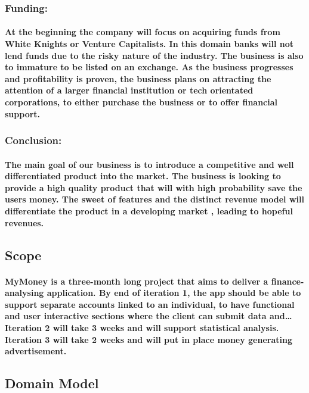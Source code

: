 \documentclass{article}
\begin{document}
\subsubsection{Funding:}
\paragraph{\indent At the beginning the company will focus on acquiring funds from White Knights or Venture Capitalists.  In this domain banks will not lend funds due to the risky nature of the industry.  The business is also to immature to be listed on an exchange.  As the business progresses and profitability is proven, the business plans on attracting the attention of a larger financial institution or tech orientated corporations, to either purchase the business or to offer financial support.}

\subsubsection{Conclusion:}
\paragraph{\indent The main goal of our business is to introduce  a competitive and well differentiated product into the market.  The business is looking to provide a high quality product that will with high probability save the users money.  The sweet of features and the distinct revenue model will differentiate the product in a developing market , leading to hopeful revenues.}

\subsection{Scope}
\paragraph{\indent MyMoney is a three-month long project that aims to deliver a finance-analysing application.  By end of iteration 1, the app should be able to support separate accounts linked to an individual, to have functional and user interactive sections where the client can submit data and… Iteration 2 will take 3 weeks and will support statistical analysis. Iteration 3 will take 2 weeks and will put in place money generating advertisement. }

\subsection{Domain Model}
\end{document}
